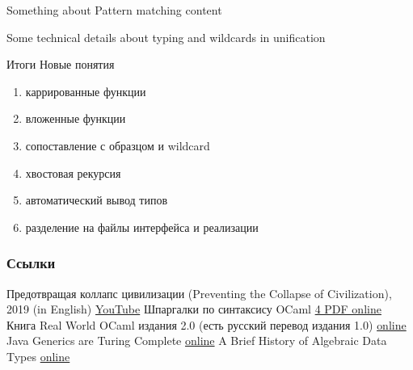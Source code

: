 \documentclass[aspectratio=169
  , xcolor={svgnames}
  , hyperref=
      { colorlinks
      , urlcolor=DarkBlue
      }
  , russian  %
  ]{beamer}
\begin{document}
\begin{frame}{Something about Pattern matching}
content
\end{frame}



\begin{frame}{}
Some technical details about typing and wildcards in unification
\end{frame}



\begin{frame}{Итоги}
Новые понятия
\begin{enumerate}
\item каррированные функции
\item вложенные функции
\item сопоставление с образцом и wildcard
\item хвостовая рекурсия
\item автоматический вывод типов
\item разделение на файлы интерфейса и реализации
\end{enumerate}
\end{frame}

\begin{frame}[allowframebreaks]
\frametitle<presentation>{Ссылки}
\begin{thebibliography}{10}
    Предотвращая коллапс цивилизации (Preventing the Collapse of Civilization), 2019 (in English)
    \newblock\href{https://youtu.be/pW-SOdj4Kkk}{YouTube}
    Шпаргалки по синтаксису OCaml
    \newblock\href{https://ocaml.org/docs/cheat_sheets.html}{4 PDF online}
    Книга Real World OCaml издания 2.0 (есть русский перевод издания 1.0)
    \newblock\href{https://dev.realworldocaml.org/toc.html}{online}
    Java Generics are Turing Complete
    \newblock\href{https://arxiv.org/pdf/1605.05274}{online}
    A Brief History of Algebraic Data Types
    \newblock\href{https://docs.google.com/presentation/d/131_CYsd9mEL-0XqXMyV7JeahWgtNCUV_JwjH7WqYFcI/edit}{online}
\end{thebibliography}
\end{frame}
\end{document}
